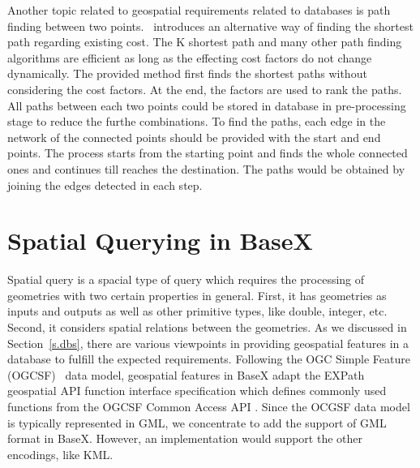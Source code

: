 \documentclass[a4paper,12pt]{article}
\begin{document}
Another topic related to geospatial requirements related to databases is path finding between two points.~\cite{} introduces an alternative way of finding the shortest path regarding existing cost. The K shortest path and many other path finding algorithms are efficient as long as the effecting cost factors do not change dynamically. The provided method first finds the shortest paths without considering the cost factors. At the end, the factors are used to rank the paths. All paths between each two points could be stored in database in pre-processing stage to reduce the furthe combinations. To find the paths, each edge in the network of the connected points should be provided with the start and end points. The process starts from the starting point and finds the whole connected ones and continues till reaches the destination. The paths would be obtained by joining the edges detected in each step.
















\newpage
\section{Spatial Querying in BaseX}
\label{s.basex}
Spatial query is a spacial type of query which requires the processing of geometries with two certain properties in general. First, it has geometries as inputs and outputs as well as other primitive types, like double, integer, etc. Second, it considers spatial relations between the geometries.
As we discussed in Section~\ref{s.dbs}, there are various viewpoints in providing geospatial features in a database to fulfill the expected requirements. Following the OGC Simple Feature (OGCSF)~\cite{springergeo} data model, geospatial features in BaseX adapt the EXPath geospatial API function interface specification which defines commonly used functions from the OGCSF Common Access API \cite{simpleFeature}. Since the OCGSF data model is typically represented in GML, we concentrate to add the support of GML format in BaseX. However, an implementation would support the other encodings, like KML. 
\end{document}
